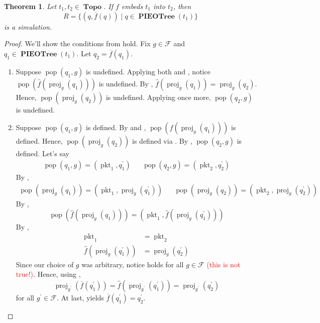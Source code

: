 \documentclass{amsart}
\DeclareMathOperator{\pkt}{\mathrm{pkt}}
\DeclareMathOperator{\pop}{\mathrm{pop}}
\DeclareMathOperator{\proj}{\mathrm{proj}}
\DeclareMathOperator{\Topo}{\mathbf{Topo}}
\DeclareMathOperator{\PIEOTree}{\mathbf{PIEOTree}}
\newtheorem{thm}{Theorem}[section]
\theoremstyle{definition}
\begin{document}
\begin{thm}
    \label{thm:profit}
    Let $t_1, t_2 \in \Topo$. If $f$ embeds $t_1$ into $t_2$, then 
    $$R = \{(q, \overline{f}(q)) \mid q \in \PIEOTree(t_1)\}$$ 
    is a simulation.
\end{thm}

\begin{proof}
    We'll show the conditions from  hold.
    Fix $g \in \mathcal F$ and $q_1 \in \PIEOTree(t_1)$.
    Let $q_2 = \overline{f}(q_1)$.
    \begin{enumerate}
        \item Suppose $\pop(q_1, g)$ is undefined. 
            Applying both  and \cite[Lemma ~5.6]{OG}, notice $\pop(\widehat{f}(\proj_g(q_1)))$ is undefined.
            By , $\widehat{f}(\proj_g(q_1)) = \proj_g(q_2)$.
            Hence, $\pop(\proj_g(q_2))$ is undefined.
            Applying  once more, $\pop(q_2, g)$ is undefined.

        \item Suppose $\pop(q_1, g)$ is defined. 
            By  and \cite[Lemma ~5.6]{OG}, $\pop(\widehat{f}(\proj_g(q_1)))$ is defined.
            Hence, $\pop(\proj_g(q_2))$ is defined via .
            By , $\pop(q_2, g)$ is defined.
            Let's say 
            \begin{align*}
                \pop(q_1, g) = (\pkt_1, q_1^\prime) && \pop(q_2, g) = (\pkt_2, q_2^\prime)
            \end{align*}
            By , 
            \begin{align*}
                \pop(\proj_g(q_1)) = (\pkt_1, \proj_g(q_1^\prime)) 
                &&
                \pop(\proj_g(q_2)) = (\pkt_2, \proj_g(q_2^\prime))
            \end{align*}
            By \cite[Lemma ~5.7]{OG},
            $$\pop(\widehat{f}(\proj_g(q_1))) = (\pkt_1, \widehat{f}(\proj_g(q_1^\prime)))$$
            By ,
            \begin{align*}
                \pkt_1 &= \pkt_2\\
                \widehat{f}(\proj_g(q_1^\prime)) &= \proj_g(q_2^\prime) \label{eq:popsim} \tag{$\dagger$} 
            \end{align*}
            Since our choice of $g$ was arbitrary, notice  holds for all $g \in \mathcal F$ \textcolor{red}{(this is not true!)}.
            Hence, using ,
            $$\proj_{g^\prime}(\overline{f}(q_1^\prime)) = \widehat{f}(\proj_{g^\prime}(q_1^\prime)) = \proj_{g^\prime}(q_2^\prime)$$
            for all $g^\prime \in \mathcal F$. 
            At last,  yields $\overline{f}(q_1^\prime) = q_2^\prime$. 
        

\end{enumerate}
\end{proof}
\end{document}

